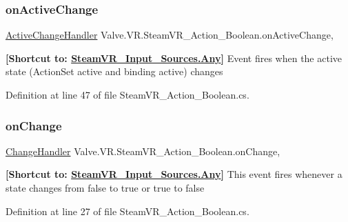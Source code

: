 \subsubsection{\texorpdfstring{onActiveChange}{onActiveChange}}
{\footnotesize\ttfamily \mbox{\hyperlink{class_valve_1_1_v_r_1_1_steam_v_r___action___boolean_af9f3044d5e4868485945b70d907c6bbb}{Active\+Change\+Handler}} Valve.\+V\+R.\+Steam\+V\+R\+\_\+\+Action\+\_\+\+Boolean.\+on\+Active\+Change\hspace{0.3cm}{\ttfamily [add]}, {\ttfamily [remove]}}



{\bfseries{\mbox{[}Shortcut to\+: \mbox{\hyperlink{namespace_valve_1_1_v_r_a82e5bf501cc3aa155444ee3f0662853faed36a1ef76a59ee3f15180e0441188ad}{Steam\+V\+R\+\_\+\+Input\+\_\+\+Sources.\+Any}}\mbox{]}}} Event fires when the active state (Action\+Set active and binding active) changes 



Definition at line 47 of file Steam\+V\+R\+\_\+\+Action\+\_\+\+Boolean.\+cs.

\mbox{\label{class_valve_1_1_v_r_1_1_steam_v_r___action___boolean_a1d971e8340acfb9075164a5390cda27a}} 
\subsubsection{\texorpdfstring{onChange}{onChange}}
{\footnotesize\ttfamily \mbox{\hyperlink{class_valve_1_1_v_r_1_1_steam_v_r___action___boolean_a9dbdff089d05d822688005fa19fef120}{Change\+Handler}} Valve.\+V\+R.\+Steam\+V\+R\+\_\+\+Action\+\_\+\+Boolean.\+on\+Change\hspace{0.3cm}{\ttfamily [add]}, {\ttfamily [remove]}}



{\bfseries{\mbox{[}Shortcut to\+: \mbox{\hyperlink{namespace_valve_1_1_v_r_a82e5bf501cc3aa155444ee3f0662853faed36a1ef76a59ee3f15180e0441188ad}{Steam\+V\+R\+\_\+\+Input\+\_\+\+Sources.\+Any}}\mbox{]}}} This event fires whenever a state changes from false to true or true to false 



Definition at line 27 of file Steam\+V\+R\+\_\+\+Action\+\_\+\+Boolean.\+cs.

